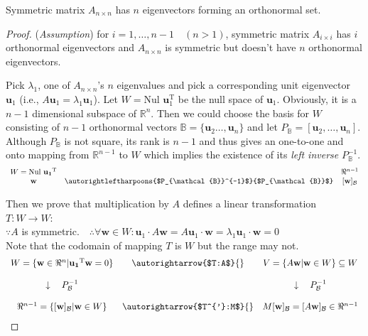 \begin{conclusion}
Symmetric matrix $A_{n\times{}n}$ has $n$ eigenvectors forming an orthonormal set.
\end{conclusion}
\begin{proof}
(\emph{Assumption}) for $i=1,\ldots,n-1\quad{}(n>1)$, symmetric matrix $A_{i\times{}i}$
has $i$ orthonormal eigenvectors and $A_{n\times{}n}$ is symmetric but
doesn't have $n$ orthonormal eigenvectors.

Pick $\lambda_1$, one of $A_{n\times{}n}$'s $n$ eigenvalues and pick a
corresponding unit eigenvector $\mathbf{u}_1$ (i.e.,
        $A\mathbf{u}_{1}=\lambda_{1}\mathbf{u}_{1}$). Let
$W=\text{Nul }\mathbf{u}_{1}^{\mathrm{T}}$ be the
null space of $\mathbf{u}_1$. Obviously, it is a $n-1$ dimensional
subspace of $\mathbb{R}^{n}$. Then we could choose the basis for $W$
consisting of $n-1$ orthonormal vectors
$\mathbb{B}=\{\mathbf{u}_{2}\ldots,\mathbf{u}_{n}\}$ and let
$P_{\mathbb{B}}=[\mathbf{u}_{2},\ldots,\mathbf{u}_{n}]$. Although
$P_{\mathbb{B}}$ is not square, its rank is $n-1$ and thus
gives an one-to-one and onto mapping from $\mathbb{R}^{n-1}$ to $W$ 
which implies the existence of its \emph{left inverse} $P_{\mathbb{B}}^{-1}$.
$$
\begin{array}{ccc}
W=\text{Nul }\mathbf{u_1}^{\mathrm{\textnormal{T}}} & &\Re^{n-1}\\
\mathbf{w} & \autorightleftharpoons{$P_{\mathcal{B}}^{-1}$}{$P_{\mathcal{B}}$}
&[\mathbf{w}]_{\mathcal{B}}\\
\end{array}
$$


Then we prove that multiplication by $A$ defines a linear
transformation $T:W\rightarrow{}W$:\\
$\because{}A$ is
symmetric.$\quad{}\therefore{}\forall{}\mathbf{w}\in{}W:\mathbf{u}_{1}\cdot{}A\mathbf{w}=A\mathbf{u}_{1}\cdot{}\mathbf{w}=\lambda_{1}\mathbf{u}_{1}\cdot{}\mathbf{w}=0$\\
Note that the codomain of mapping $T$ is $W$ but the range may not.
$$
\begin{array}{ccc}
W=\{\mathbf{w}\in\Re^{n}\vert\mathbf{u_1}^{\mathrm{\textnormal{T}}}\mathbf{w}=0\}
& \autorightarrow{$T:A$}{} & V=\{A\mathbf{w}\vert\mathbf{w}\in
W\}\subseteq W\\
& &\\
\downarrow\quad P_{\mathcal{B}}^{-1} & & \downarrow\quad P_{\mathcal{B}}^{-1}\\
& &\\
\Re^{n-1}=\{[\mathbf{w}]_{\mathcal{B}}\vert\mathbf{w}\in W\} &
\autorightarrow{$T^{'}:M$}{} &
M[\mathbf{w}]_{\mathcal{B}}=[A\mathbf{w}]_{\mathcal{B}}\in\Re^{n-1}\\
\end{array}
$$



\end{proof}
